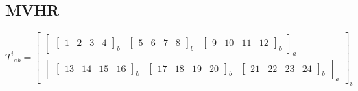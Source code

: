 \subsection{MVHR}
\[
    T^i{}_{ab}=
    \left[\begin{array}{c}
            \left[\begin{array}{ccc}
                          \left[\begin{array}{NNNN}
                                  1 &
                                  2 &
                                  3 &
                                  4
                              \end{array}\right]_{b}
                           &
                          \left[\begin{array}{NNNN}
                                  5 &
                                  6 &
                                  7 &
                                  8
                              \end{array}\right]_{b}
                           &
                          \left[\begin{array}{NNNN}
                                  9  &
                                  10 &
                                  11 &
                                  12
                              \end{array}\right]_{b}
                      \end{array}\right]_{a}
            \\
            \left[\begin{array}{ccc}
                          \left[\begin{array}{NNNN}
                                  13 &
                                  14 &
                                  15 &
                                  16
                              \end{array}\right]_{b}
                           &
                          \left[\begin{array}{NNNN}
                                  17 &
                                  18 &
                                  19 &
                                  20
                              \end{array}\right]_{b}
                           &
                          \left[\begin{array}{NNNN}
                                  21 &
                                  22 &
                                  23 &
                                  24
                              \end{array}\right]_{b}
                      \end{array}\right]_{a}
        \end{array}\right]_{i}
\]
